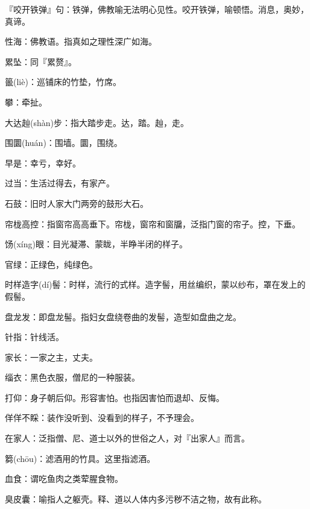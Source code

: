 \startbuffer[862]
『咬开铁弹』句：铁弹，佛教喻无法明心见性。咬开铁弹，喻顿悟。消息，奥妙，真谛。
\stopbuffer


\startbuffer[863]
性海：佛教语。指真如之理性深广如海。
\stopbuffer


\startbuffer[864]
累坠：同『累赘』。
\stopbuffer


\startbuffer[865]
䉭(liè)：巡铺床的竹垫，竹席。
\stopbuffer


\startbuffer[866]
攀：牵扯。
\stopbuffer


\startbuffer[867]
大达赸(shàn)步：指大踏步走。达，踏。赸，走。
\stopbuffer


\startbuffer[868]
围圜(huán)：围墙。圜，围绕。
\stopbuffer


\startbuffer[869]
早是：幸亏，幸好。
\stopbuffer


\startbuffer[870]
过当：生活过得去，有家产。
\stopbuffer


\startbuffer[871]
石鼓：旧时人家大门两旁的鼓形大石。
\stopbuffer


\startbuffer[872]
帘栊高控：指窗帘高高垂下。帘栊，窗帘和窗牖，泛指门窗的帘子。控，下垂。
\stopbuffer


\startbuffer[873]
饧(xíng)眼：目光凝滞、蒙眬，半睁半闭的样子。
\stopbuffer


\startbuffer[874]
官绿：正绿色，纯绿色。
\stopbuffer


\startbuffer[875]
时样造字(dí)髻：时样，流行的式样。造字髻，用丝编织，蒙以纱布，罩在发上的假髻。
\stopbuffer


\startbuffer[876]
盘龙发：即盘龙髻。指妇女盘绕卷曲的发髻，造型如盘曲之龙。
\stopbuffer


\startbuffer[877]
针指：针线活。
\stopbuffer


\startbuffer[878]
家长：一家之主，丈夫。
\stopbuffer


\startbuffer[879]
缁衣：黑色衣服，僧尼的一种服装。
\stopbuffer


\startbuffer[880]
打仰：身子朝后仰。形容害怕。也指因害怕而退却、反悔。
\stopbuffer


\startbuffer[881]
佯佯不睬：装作没听到、没看到的样子，不予理会。
\stopbuffer


\startbuffer[882]
在家人：泛指僧、尼、道士以外的世俗之人，对『出家人』而言。
\stopbuffer


\startbuffer[883]
篘(chōu)：滤酒用的竹具。这里指滤酒。
\stopbuffer


\startbuffer[884]
血食：谓吃鱼肉之类荤腥食物。
\stopbuffer


\startbuffer[885]
臭皮囊：喻指人之躯壳。释、道以人体内多污秽不洁之物，故有此称。
\stopbuffer


